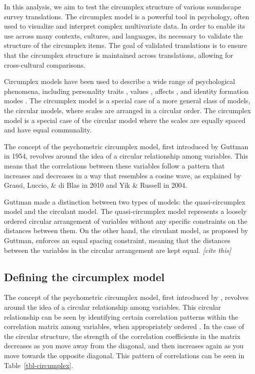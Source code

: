 \documentclass[
  authoryear,
  preprint,
  3p]{elsarticle}
\begin{document}
In this analysis, we aim to test the circumplex structure of various
soundscape survey translations. The circumplex model is a powerful tool
in psychology, often used to visualize and interpret complex
multivariate data. In order to enable its use across many contexts,
cultures, and languages, its necessary to validate the structure of the
circumplex items. The goal of validated translations is to ensure that
the circumplex structure is maintained across translations, allowing for
cross-cultural comparisons.

Circumplex models have been used to describe a wide range of
psychological phenomena, including personality traits
\citep{Wiggins1979psychological}, values \citep{Schwartz1992Universals},
affects \citep{Russell1980circumplex}, and identity formation modes
\citep{Cieciuch2016Circumplex}. The circumplex model is a special case
of a more general class of models, the circular models, where scales are
arranged in a circular order. The circumplex model is a special case of
the circular model where the scales are equally spaced and have equal
communality.

The concept of the psychometric circumplex model, first introduced by
Guttman in 1954, revolves around the idea of a circular relationship
among variables. This means that the correlations between these
variables follow a pattern that increases and decreases in a way that
resembles a cosine wave, as explained by Grassi, Luccio, \& di Blas in
2010 and Yik \& Russell in 2004.

Guttman made a distinction between two types of models: the
quasi-circumplex model and the circulant model. The quasi-circumplex
model represents a loosely ordered circular arrangement of variables
without any specific constraints on the distances between them. On the
other hand, the circulant model, as proposed by Guttman, enforces an
equal spacing constraint, meaning that the distances between the
variables in the circular arrangement are kept equal. \emph{{[}cite
this{]}}

\subsection{Defining the circumplex
model}\label{defining-the-circumplex-model}

The concept of the psychometric circumplex model, first introduced by
\citet{Guttman1954new}, revolves around the idea of a circular
relationship among variables. This circular relationship can be seen by
identifying certain correlation patterns within the correlation matrix
among variables, when appropriately ordered
\citep{Browne1992Circumplex}. In the case of the circular structure, the
strength of the correlation coefficients in the matrix decreases as you
move away from the diagonal, and then increases again as you move
towards the opposite diagonal. This pattern of correlations can be seen
in Table~\ref{tbl-circumplex}.
\end{document}
